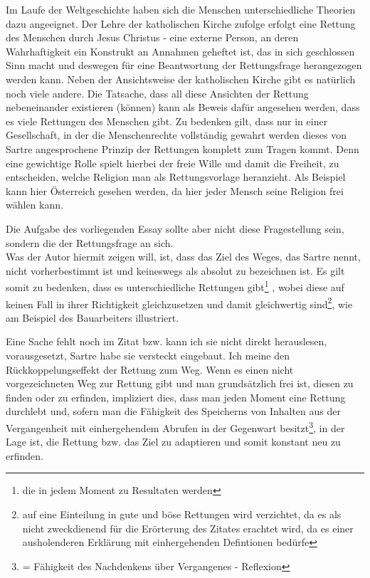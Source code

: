 \documentclass[12pt,a4paper,oneside]{article}
\begin{document}
  Im Laufe der Weltgeschichte haben sich die Menschen unterschiedliche Theorien dazu angeeignet. Der Lehre der katholischen Kirche zufolge erfolgt eine Rettung des Menschen durch Jesus Christus - eine externe Person, an deren Wahrhaftigkeit ein Konstrukt an Annahmen geheftet ist, das in sich geschlossen Sinn macht und deswegen für eine Beantwortung der Rettungsfrage herangezogen werden kann. Neben der Ansichtsweise der katholischen Kirche gibt es natürlich noch viele andere. Die Tatsache, dass all diese Ansichten der Rettung nebeneinander existieren (können) kann als Beweis dafür angesehen werden, dass es viele Rettungen des Menschen gibt. Zu bedenken gilt, dass nur in einer Gesellschaft, in der die Menschenrechte vollständig gewahrt werden dieses von Sartre angesprochene Prinzip der Rettungen komplett zum Tragen kommt. Denn eine gewichtige Rolle spielt hierbei der freie Wille und damit die Freiheit, zu entscheiden, welche Religion man als Rettungsvorlage heranzieht. Als Beispiel kann hier Österreich gesehen werden, da hier jeder Mensch seine Religion frei wählen kann. 
  
  Die Aufgabe des vorliegenden Essay sollte aber nicht diese Fragestellung sein, sondern die der Rettungsfrage an sich.\\
  
  Was der Autor hiermit zeigen will, ist, dass das Ziel des Weges, das Sartre nennt, nicht vorherbestimmt ist und keineswegs als absolut zu bezeichnen ist. Es gilt somit zu bedenken, dass es unterschiedliche Rettungen gibt\footnote{die in jedem Moment zu Resultaten werden} , wobei diese auf keinen Fall in ihrer Richtigkeit gleichzusetzen und damit gleichwertig sind\footnote{auf eine Einteilung in gute und böse Rettungen wird verzichtet, da es als nicht zweckdienend für die Erörterung des Zitates erachtet wird, da es einer ausholenderen Erklärung mit einhergehenden Defintionen bedürfe}, wie am Beispiel des Bauarbeiters illustriert. 
  
  Eine Sache fehlt noch im Zitat bzw. kann ich sie nicht direkt herauslesen, vorausgesetzt, Sartre habe sie versteckt eingebaut. Ich meine den Rückkoppelungseffekt der Rettung zum Weg. Wenn es einen nicht vorgezeichneten Weg zur Rettung gibt und man grundsätzlich frei ist, diesen zu finden oder zu erfinden, impliziert dies, dass man jeden Moment eine Rettung durchlebt und, sofern man die Fähigkeit des Speicherns von Inhalten aus der Vergangenheit mit einhergehendem Abrufen in der Gegenwart besitzt\footnote{= Fähigkeit des Nachdenkens über Vergangenes - Reflexion}, in der Lage ist, die Rettung bzw. das Ziel zu adaptieren und somit konstant neu zu erfinden. \\
  
\end{document}
